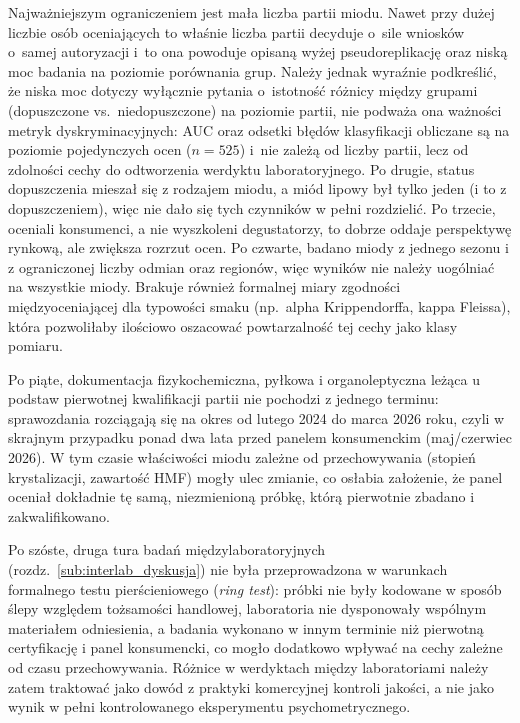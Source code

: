 \documentclass[12pt,a4paper]{article}
\begin{document}
Najważniejszym ograniczeniem jest mała liczba partii miodu. Nawet przy dużej
liczbie osób oceniających to właśnie liczba partii decyduje o~sile wniosków
o~samej autoryzacji i~to ona powoduje opisaną wyżej pseudoreplikację oraz niską
moc badania na poziomie porównania grup. Należy jednak wyraźnie podkreślić, że
niska moc dotyczy wyłącznie pytania o~istotność różnicy między grupami (dopuszczone
vs.\ niedopuszczone) na poziomie partii, nie podważa ona ważności metryk
dyskryminacyjnych: AUC oraz odsetki błędów klasyfikacji obliczane są na poziomie
pojedynczych ocen ($n = 525$) i~nie zależą od liczby partii, lecz od zdolności
cechy do odtworzenia werdyktu laboratoryjnego.
Po drugie, status dopuszczenia mieszał się z rodzajem miodu,
a miód lipowy był tylko jeden (i to z dopuszczeniem), więc nie dało się tych
czynników w pełni rozdzielić. Po trzecie, oceniali konsumenci, a nie wyszkoleni
degustatorzy, to dobrze oddaje perspektywę rynkową, ale zwiększa rozrzut ocen.
Po czwarte, badano miody z jednego sezonu i z ograniczonej liczby odmian oraz
regionów, więc wyników nie należy uogólniać na wszystkie miody.
Brakuje również formalnej miary zgodności międzyoceniającej dla typowości smaku
(np.\ alpha Krippendorffa, kappa Fleissa), która pozwoliłaby ilościowo oszacować
powtarzalność tej cechy jako klasy pomiaru.

Po piąte, dokumentacja fizykochemiczna, pyłkowa i organoleptyczna leżąca u podstaw
pierwotnej kwalifikacji partii nie pochodzi z jednego terminu: sprawozdania rozciągają
się na okres od lutego 2024 do marca 2026 roku, czyli w skrajnym przypadku ponad dwa
lata przed panelem konsumenckim (maj/czerwiec 2026). W tym czasie właściwości miodu
zależne od przechowywania (stopień krystalizacji, zawartość HMF) mogły ulec zmianie,
co osłabia założenie, że panel oceniał dokładnie tę samą, niezmienioną próbkę, którą
pierwotnie zbadano i zakwalifikowano.

Po szóste, druga tura badań międzylaboratoryjnych (rozdz.~\ref{sub:interlab_dyskusja})
nie była przeprowadzona w warunkach formalnego testu pierścieniowego (\emph{ring
test}): próbki nie były kodowane w sposób ślepy względem tożsamości handlowej,
laboratoria nie dysponowały wspólnym materiałem odniesienia, a badania wykonano w
innym terminie niż pierwotną certyfikację i panel konsumencki, co mogło dodatkowo
wpływać na cechy zależne od czasu przechowywania. Różnice w werdyktach między
laboratoriami należy zatem traktować jako dowód z praktyki komercyjnej kontroli
jakości, a nie jako wynik w pełni kontrolowanego eksperymentu psychometrycznego.
\end{document}
